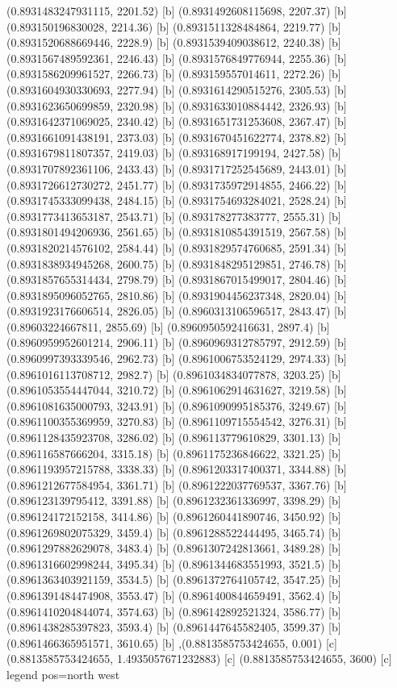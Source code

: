 {{{(0.8931483247931115, 2201.52) [b] 
(0.8931492608115698, 2207.37) [b] 
(0.893150196830028, 2214.36) [b] 
(0.8931511328484864, 2219.77) [b] 
(0.8931520688669446, 2228.9) [b] 
(0.8931539409038612, 2240.38) [b] 
(0.8931567489592361, 2246.43) [b] 
(0.8931576849776944, 2255.36) [b] 
(0.8931586209961527, 2266.73) [b] 
(0.893159557014611, 2272.26) [b] 
(0.8931604930330693, 2277.94) [b] 
(0.8931614290515276, 2305.53) [b] 
(0.8931623650699859, 2320.98) [b] 
(0.8931633010884442, 2326.93) [b] 
(0.8931642371069025, 2340.42) [b] 
(0.8931651731253608, 2367.47) [b] 
(0.8931661091438191, 2373.03) [b] 
(0.8931670451622774, 2378.82) [b] 
(0.8931679811807357, 2419.03) [b] 
(0.893168917199194, 2427.58) [b] 
(0.8931707892361106, 2433.43) [b] 
(0.8931717252545689, 2443.01) [b] 
(0.8931726612730272, 2451.77) [b] 
(0.8931735972914855, 2466.22) [b] 
(0.8931745333099438, 2484.15) [b] 
(0.8931754693284021, 2528.24) [b] 
(0.8931773413653187, 2543.71) [b] 
(0.893178277383777, 2555.31) [b] 
(0.8931801494206936, 2561.65) [b] 
(0.8931810854391519, 2567.58) [b] 
(0.8931820214576102, 2584.44) [b] 
(0.8931829574760685, 2591.34) [b] 
(0.8931838934945268, 2600.75) [b] 
(0.8931848295129851, 2746.78) [b] 
(0.8931857655314434, 2798.79) [b] 
(0.8931867015499017, 2804.46) [b] 
(0.8931895096052765, 2810.86) [b] 
(0.8931904456237348, 2820.04) [b] 
(0.8931923176606514, 2826.05) [b] 
(0.8960313106596517, 2843.47) [b] 
(0.89603224667811, 2855.69) [b] 
(0.8960950592416631, 2897.4) [b] 
(0.8960959952601214, 2906.11) [b] 
(0.8960969312785797, 2912.59) [b] 
(0.8960997393339546, 2962.73) [b] 
(0.8961006753524129, 2974.33) [b] 
(0.8961016113708712, 2982.7) [b] 
(0.8961034834077878, 3203.25) [b] 
(0.8961053554447044, 3210.72) [b] 
(0.8961062914631627, 3219.58) [b] 
(0.8961081635000793, 3243.91) [b] 
(0.8961090995185376, 3249.67) [b] 
(0.8961100355369959, 3270.83) [b] 
(0.8961109715554542, 3276.31) [b] 
(0.8961128435923708, 3286.02) [b] 
(0.896113779610829, 3301.13) [b] 
(0.896116587666204, 3315.18) [b] 
(0.8961175236846622, 3321.25) [b] 
(0.8961193957215788, 3338.33) [b] 
(0.8961203317400371, 3344.88) [b] 
(0.8961212677584954, 3361.71) [b] 
(0.8961222037769537, 3367.76) [b] 
(0.896123139795412, 3391.88) [b] 
(0.8961232361336997, 3398.29) [b] 
(0.896124172152158, 3414.86) [b] 
(0.8961260441890746, 3450.92) [b] 
(0.8961269802075329, 3459.4) [b] 
(0.8961288522444495, 3465.74) [b] 
(0.8961297882629078, 3483.4) [b] 
(0.8961307242813661, 3489.28) [b] 
(0.8961316602998244, 3495.34) [b] 
(0.8961344683551993, 3521.5) [b] 
(0.8961363403921159, 3534.5) [b] 
(0.8961372764105742, 3547.25) [b] 
(0.8961391484474908, 3553.47) [b] 
(0.8961400844659491, 3562.4) [b] 
(0.8961410204844074, 3574.63) [b] 
(0.896142892521324, 3586.77) [b] 
(0.8961438285397823, 3593.4) [b] 
(0.8961447645582405, 3599.37) [b] 
(0.8961466365951571, 3610.65) [b] 
},{(0.8813585753424655, 0.001) [c] 
(0.8813585753424655, 1.4935057671232883) [c] 
(0.8813585753424655, 3600) [c] 
}}}{legend pos=north west}